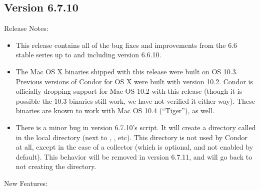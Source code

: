\subsection*{\label{sec:New-6-7-10}Version 6.7.10}

\noindent Release Notes:

\begin{itemize}

\item This release contains all of the bug fixes and improvements from
  the 6.6 stable series up to and including version 6.6.10.

\item The Mac OS X binaries shipped with this release were built on OS
  10.3.  Previous versions of Condor for OS X were built with version
  10.2.  Condor is officially dropping support for Mac OS 10.2 with
  this release (though it is possible the 10.3 binaries still work, we
  have not verified it either way).  These binaries are known to work
  with Mac OS 10.4 (``Tiger''), as well.

\item There is a minor bug in version 6.7.10's 
  script.
  It will create a directory called  in the local
  directory (next to , , etc).
  This directory is not used by Condor at all, except in the case of a
   collector (which is optional, and not enabled by
  default). 
  This behavior will be removed in version 6.7.11, and
   will go back to not creating the 
  directory.

\end{itemize}

\noindent New Features:

